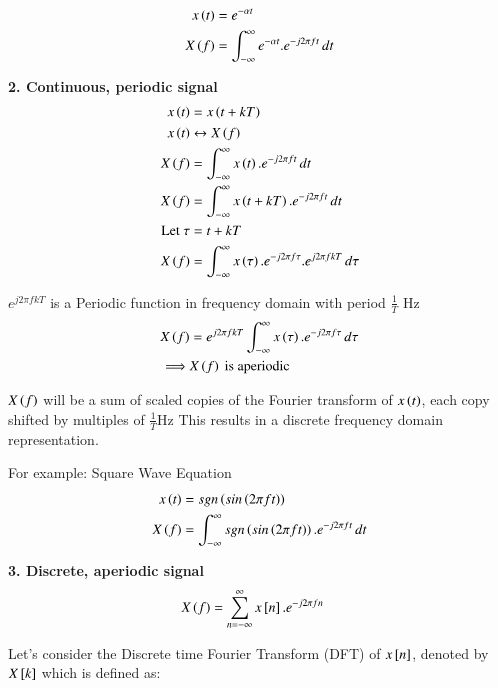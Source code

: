 \documentclass[journal,12pt,onecolumn]{IEEEtran}
\theoremstyle{remark}
\begin{document}
\begin{align}
x\left(t\right)&=e^{-\alpha t}\\
X\left(f\right)&= \int_{-\infty}^{\infty} e^{-\alpha t}.e^{-j2\pi ft}\,dt
\end{align}


\textbf{2. Continuous, periodic signal}\\

\begin{align}
x\left(t\right)&=x\left(t+kT\right)\\
x\left(t\right)& \leftrightarrow X\left(f\right)\\
X\left(f\right)&=\int_{-\infty}^{\infty} x\left(t\right).e^{-j2\pi ft}\,dt\\
X\left(f\right)&=\int_{-\infty}^{\infty} x\left(t+kT\right).e^{-j2\pi ft}\,dt\\
\text{Let } \tau &= t+kT\\
X\left(f\right)&=\int_{-\infty}^{\infty} x\left(\tau\right).e^{-j2\pi f\tau}.e^{j2\pi fkT}\,d\tau
\end{align}

$e^{j2\pi fkT} $ is a Periodic function in frequency domain with period $\frac{1}{T}$ Hz \\
\begin{align}
X\left(f\right)&=e^{j2\pi fkT}\int_{-\infty}^{\infty} x\left(\tau\right).e^{-j2\pi f\tau}\,d\tau\\
\implies &X\left(f\right) \text{ is aperiodic}
\end{align}


$X\left(f\right)$ will be  a sum of scaled copies of the Fourier transform of $x\left(t\right)$, each copy shifted by multiples of $\frac{1}{T}$Hz This results in a discrete frequency domain representation.\\
\vspace{2mm}

For example: Square Wave Equation
\begin{align}
x\left(t\right)&=sgn\left(sin\left(2\pi ft\right)\right)\\
X\left(f\right)&=\int_{-\infty}^{\infty} sgn\left(sin\left(2\pi ft\right)\right).e^{-j2\pi ft}\, dt
\end{align}


\textbf{3. Discrete, aperiodic signal}\\

\begin{align}
X\left(f\right)&= \sum_{n=-\infty}^{\infty} x{}\left[n\right].e^{-j2\pi fn}
\end{align}


Let's consider the Discrete time Fourier Transform (DFT) of $x{}\left[n\right]$, denoted by $ X{}\left[k\right]$ which is defined as:
\end{document}
